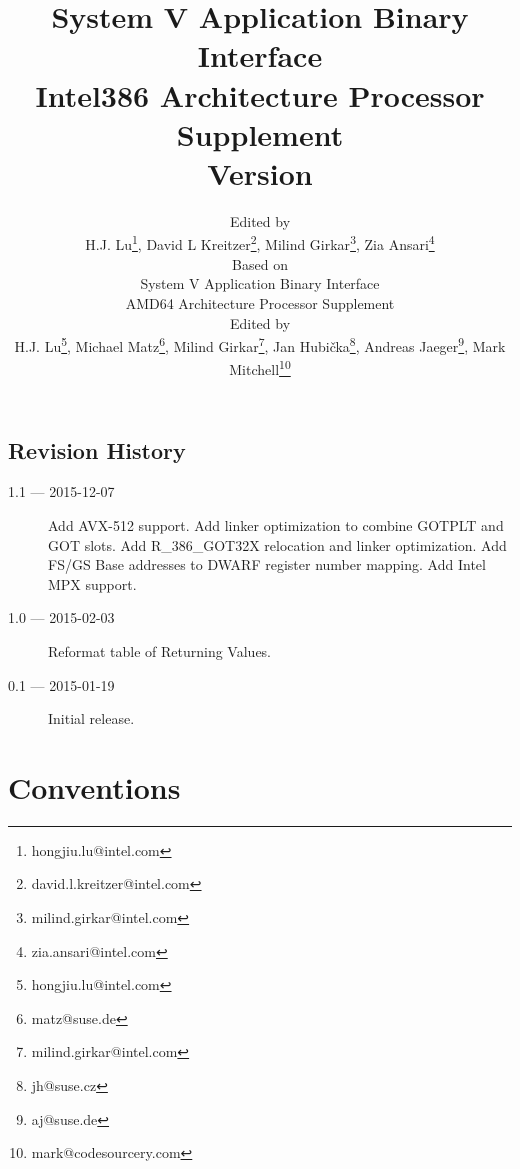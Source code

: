 \documentclass[12pt]{report}
\begin{document}
\author{Edited by\\
  H.J. Lu\thanks{hongjiu.lu@intel.com},
  David L Kreitzer\thanks{david.l.kreitzer@intel.com},
  Milind Girkar\thanks{milind.girkar@intel.com},
  Zia Ansari\thanks{zia.ansari@intel.com} \\
  \small
  Based on\\
  \small
  System V Application Binary Interface\\
  \small
  AMD64 Architecture Processor Supplement\\
  \small
  Edited by\\
  \small
  H.J. Lu\thanks{hongjiu.lu@intel.com},
  Michael Matz\thanks{matz@suse.de},
  Milind Girkar\thanks{milind.girkar@intel.com},
  Jan Hubi\v{c}ka\thanks{jh@suse.cz},
  Andreas Jaeger\thanks{aj@suse.de},
  Mark Mitchell\thanks{mark@codesourcery.com}}

\title{System V Application Binary Interface\\
{\Large Intel386 Architecture Processor Supplement\\
Version \version}}
\maketitle
\tableofcontents
\listoftables
\listoffigures

\section*{Revision History}

\begin{description}

\item[1.1 --- 2015-12-07] Add AVX-512 support.  Add linker optimization
to combine GOTPLT and GOT slots.  Add R_386_GOT32X relocation and linker
optimization.  Add FS/GS Base addresses to DWARF register number mapping.
Add Intel MPX support.
\item[1.0 --- 2015-02-03] Reformat table of Returning Values.
\item[0.1 --- 2015-01-19] Initial release.
\end{description}






\chapter{Conventions}



\appendix


\end{document}
